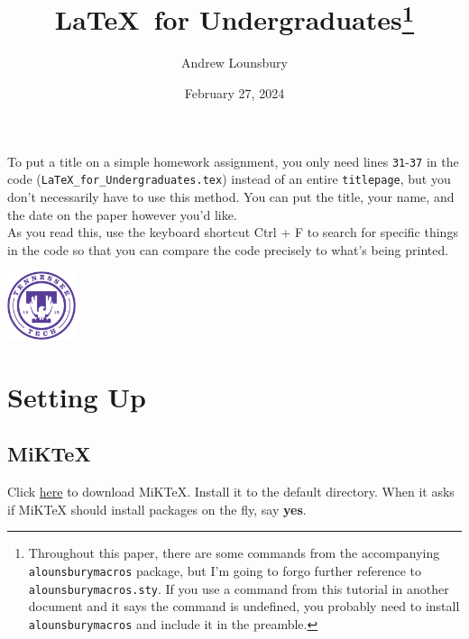 \documentclass{article} 		%
\begin{document}
\begin{titlepage}
	\title{\bfseries \LaTeX\ for Undergraduates\footnote{
			Throughout this paper, there are some commands from the accompanying \texttt{alounsburymacros} package, but I'm going to forgo further reference to \texttt{alounsburymacros.sty}. If you use a command from this tutorial in another document and it says the command is undefined, you probably need to install \texttt{alounsburymacros} and include it in the preamble. 
		}
	}
	\author{Andrew Lounsbury}
	\date{February 27, 2024}
	\maketitle
	
	\vspace{1.5in}

	To put a title on a simple homework assignment, you only need lines \texttt{31}-\texttt{37} in the code (\texttt{LaTeX\_for\_Undergraduates.tex}) instead of an entire \texttt{titlepage}, but you don't necessarily have to use this method. You can put the title, your name, and the date on the paper however you'd like. \\

	As you read this, use the keyboard shortcut Ctrl + F to search for specific things in the code so that you can compare the code precisely to what's being printed. 
	\vspace{1.5in}
	\begin{center}
		\includegraphics[width=0.15\textwidth]{TechSignatureSeal_Purple_RGB.jpg}
	\end{center}
\end{titlepage}

\tableofcontents

\newpage
\section{Setting Up} \label{sec:setting-up}
\subsection{MiKTeX} \label{subsec:miktex}
Click \href{https://miktex.org/download}{here} to download MiKTeX. Install it to the default directory. When it asks if MiKTeX should install packages on the fly, say \textbf{yes}.
\end{document}
